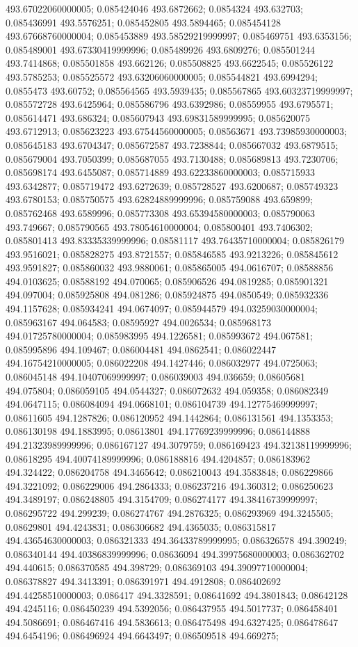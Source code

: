 493.67022060000005; 0.085424046 493.6872662; 0.0854324 493.632703; 0.085436991 493.5576251; 0.085452805 493.5894465; 0.085454128 493.67668760000004; 0.085453889 493.58529219999997; 0.085469751 493.6353156; 0.085489001 493.67330419999996; 0.085489926 493.6809276; 0.085501244 493.7414868; 0.085501858 493.662126; 0.085508825 493.6622545; 0.085526122 493.5785253; 0.085525572 493.63206060000005; 0.085544821 493.6994294; 0.0855473 493.60752; 0.085564565 493.5939435; 0.085567865 493.60323719999997; 0.085572728 493.6425964; 0.085586796 493.6392986; 0.08559955 493.6795571; 0.085614471 493.686324; 0.085607943 493.69831589999995; 0.085620075 493.6712913; 0.085623223 493.67544560000005; 0.08563671 493.73985930000003; 0.085645183 493.6704347; 0.085672587 493.7238844; 0.085667032 493.6879515; 0.085679004 493.7050399; 0.085687055 493.7130488; 0.085689813 493.7230706; 0.085698174 493.6455087; 0.085714889 493.62233860000003; 0.085715933 493.6342877; 0.085719472 493.6272639; 0.085728527 493.6200687; 0.085749323 493.6780153; 0.085750575 493.62824889999996; 0.085759088 493.659899; 0.085762468 493.6589996; 0.085773308 493.65394580000003; 0.085790063 493.749667; 0.085790565 493.78054610000004; 0.085800401 493.7406302; 0.085801413 493.83335339999996; 0.08581117 493.76435710000004; 0.085826179 493.9516021; 0.085828275 493.8721557; 0.085846585 493.9213226; 0.085845612 493.9591827; 0.085860032 493.9880061; 0.085865005 494.0616707; 0.08588856 494.0103625; 0.08588192 494.070065; 0.085906526 494.0819285; 0.085901321 494.097004; 0.085925808 494.081286; 0.085924875 494.0850549; 0.085932336 494.1157628; 0.085934241 494.0674097; 0.085944579 494.03259030000004; 0.085963167 494.064583; 0.08595927 494.0026534; 0.085968173 494.01725780000004; 0.085983995 494.1226581; 0.085993672 494.067581; 0.085995896 494.109467; 0.086004481 494.0862541; 0.086022447 494.16754210000005; 0.086022208 494.1427446; 0.086032977 494.0725063; 0.086045148 494.10407069999997; 0.086039003 494.036659; 0.08605681 494.075804; 0.086059105 494.0544327; 0.086072632 494.059358; 0.086082349 494.0647115; 0.086084094 494.0668101; 0.086104739 494.12775469999997; 0.08611605 494.1287826; 0.086120952 494.1442864; 0.086131561 494.1353353; 0.086130198 494.1883995; 0.08613801 494.17769239999996; 0.086144888 494.21323989999996; 0.086167127 494.3079759; 0.086169423 494.32138119999996; 0.08618295 494.40074189999996; 0.086188816 494.4204857; 0.086183962 494.324422; 0.086204758 494.3465642; 0.086210043 494.3583848; 0.086229866 494.3221092; 0.086229006 494.2864333; 0.086237216 494.360312; 0.086250623 494.3489197; 0.086248805 494.3154709; 0.086274177 494.38416739999997; 0.086295722 494.299239; 0.086274767 494.2876325; 0.086293969 494.3245505; 0.08629801 494.4243831; 0.086306682 494.4365035; 0.086315817 494.43654630000003; 0.086321333 494.36433789999995; 0.086326578 494.390249; 0.086340144 494.40386839999996; 0.08636094 494.39975680000003; 0.086362702 494.440615; 0.086370585 494.398729; 0.086369103 494.39097710000004; 0.086378827 494.3413391; 0.086391971 494.4912808; 0.086402692 494.44258510000003; 0.086417 494.3328591; 0.08641692 494.3801843; 0.08642128 494.4245116; 0.086450239 494.5392056; 0.086437955 494.5017737; 0.086458401 494.5086691; 0.086467416 494.5836613; 0.086475498 494.6327425; 0.086478647 494.6454196; 0.086496924 494.6643497; 0.086509518 494.669275; 